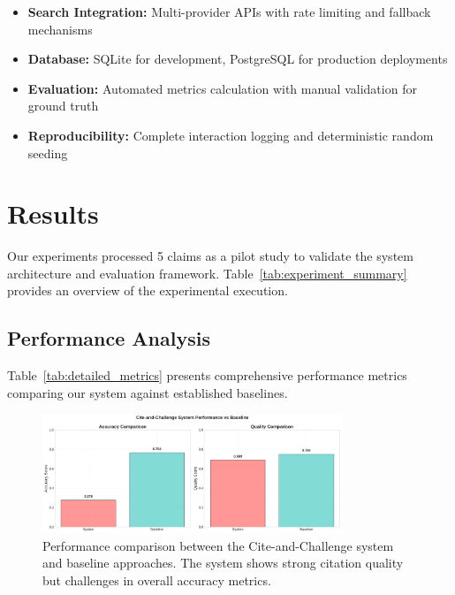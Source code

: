 \documentclass{article}
\begin{document}
\begin{itemize}
    \item \textbf{Search Integration:} Multi-provider APIs with rate limiting and fallback mechanisms
    \item \textbf{Database:} SQLite for development, PostgreSQL for production deployments
    \item \textbf{Evaluation:} Automated metrics calculation with manual validation for ground truth
    \item \textbf{Reproducibility:} Complete interaction logging and deterministic random seeding
\end{itemize}

\section{Results}



Our experiments processed 5 claims as a pilot study to validate the system architecture and evaluation framework. Table~\ref{tab:experiment_summary} provides an overview of the experimental execution.

\subsection{Performance Analysis}



Table~\ref{tab:detailed_metrics} presents comprehensive performance metrics comparing our system against established baselines. 

\begin{figure}[htbp]
\centering
\includegraphics[width=0.8\textwidth]{figures/performance_comparison.png}
\caption{Performance comparison between the Cite-and-Challenge system and baseline approaches. The system shows strong citation quality but challenges in overall accuracy metrics.}
\label{fig:performance_comparison}
\end{figure}
\end{document}
